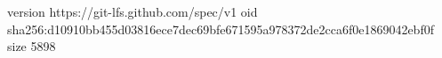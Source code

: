 version https://git-lfs.github.com/spec/v1
oid sha256:d10910bb455d03816ece7dec69bfe671595a978372de2cca6f0e1869042ebf0f
size 5898
